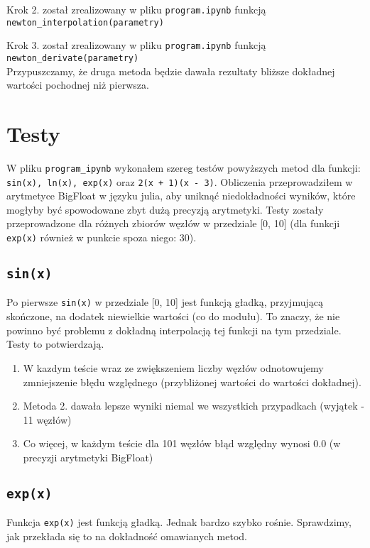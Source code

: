 \documentclass[a4paper,10pt]{article}
\begin{document}
   Krok 2. został zrealizowany w pliku \texttt{program.ipynb} funkcją
   \texttt{newton\_interpolation(parametry)}
   
   Krok 3. został zrealizowany w pliku \texttt{program.ipynb} funkcją
   \texttt{newton\_derivate(parametry)}\\
      
   Przypuszczamy, że druga metoda będzie dawała rezultaty bliższe dokładnej 
   wartości pochodnej niż pierwsza.
   
   \section{Testy}
    W pliku \texttt{program\_ipynb} wykonałem szereg testów powyższych metod
    dla funkcji: \texttt{sin(x), ln(x), exp(x)} oraz \texttt{2(x + 1)(x - 3)}.
    Obliczenia przeprowadziłem w arytmetyce BigFloat w języku julia, aby uniknąć
    niedokładności wyników, które mogłyby być spowodowane zbyt dużą precyzją
    arytmetyki. Testy zostały przeprowadzone dla różnych zbiorów węzłów w przedziale
    [0, 10] (dla funkcji \texttt{exp(x)} również w punkcie spoza niego: 30).
    
    \subsection{\texttt{sin(x)}}
     Po pierwsze \texttt{sin(x)} w przedziale [0, 10] jest funkcją gładką, przyjmującą skończone,
     na dodatek niewielkie wartości (co do modułu). To znaczy, że nie powinno być problemu
     z dokładną interpolacją tej funkcji na tym przedziale. Testy to potwierdzają.
     \begin{enumerate}
      \item W kazdym teście wraz ze zwiększeniem liczby węzłów
      odnotowujemy zmniejszenie błędu względnego (przybliżonej wartości do wartości
      dokładnej). 
      \item Metoda 2. dawała lepsze wyniki niemal we wszystkich przypadkach
      (wyjątek - 11 węzłów)
      \item Co więcej, w każdym teście dla 101 węzłów błąd względny wynosi 0.0 (w precyzji
      arytmetyki BigFloat)
     \end{enumerate}
     
    \subsection{\texttt{exp(x)}}
     Funkcja \texttt{exp(x)} jest funkcją gładką. Jednak bardzo szybko rośnie. Sprawdzimy,
     jak przekłada się to na dokładność omawianych metod.
    
\end{document}
